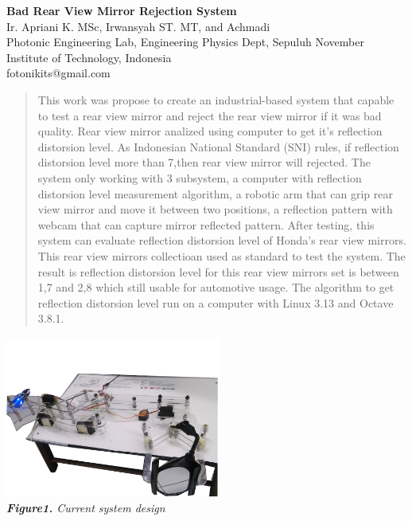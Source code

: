 \documentclass[a4paper,10pt]{article}
\title{}
\author{}
\begin{document}
\begin{center}
 \LARGE \textbf{Bad Rear View Mirror Rejection System}\\
 \large Ir. Apriani K. MSc, Irwansyah ST. MT, and Achmadi\\
 \large Photonic Engineering Lab, Engineering Physics Dept, Sepuluh November Institute of Technology, Indonesia\\
 \large fotonikits@gmail.com
\end{center}


\begin{abstract}

This work was propose to create an industrial-based system that capable to test a rear view mirror and reject the rear view mirror if it was bad quality.
Rear view mirror analized using computer to get it's reflection distorsion level.
As Indonesian National Standard (SNI) rules, if reflection distorsion level more than 7,then rear view mirror will rejected.
The system only working with 3 subsystem,
 a computer with reflection distorsion level measurement algorithm,
 a robotic arm that can grip rear view mirror and move it between two positions,
 a reflection pattern with webcam that can capture mirror reflected pattern. 
After testing, this system can evaluate reflection distorsion level of Honda's rear view mirrors.
This rear view mirrors collectioan used as standard to test the system.
The result is reflection distorsion level for this rear view mirrors set is between 1,7 and 2,8 which still usable for automotive usage.
The algorithm to get reflection distorsion level run on a computer with Linux 3.13 and Octave 3.8.1.
 
\end{abstract}

\begin{center}
 \includegraphics[width=200pt]{selected_system}\\
 \textit{\textbf{Figure1.} Current system design}
\end{center}
\end{document}

